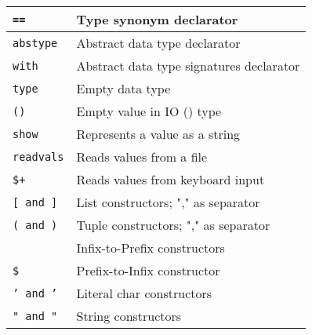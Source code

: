 \documentclass[]{article}
\begin{document}
\begin{minipage}[t][0pt]{\linewidth}
\begin{tabular}{ | l | l | }
	\texttt{==}                     & Type synonym declarator                           \\ \hline
	\texttt{abstype}                & Abstract data type declarator                     \\ \hline
	\texttt{with}                   & Abstract data type signatures declarator          \\ \hline
	\texttt{type}                   & Empty data type                                   \\ \hline
	\texttt{()}                     & Empty value in IO () type                         \\ \hline
	\hline
	\texttt{show}                   & Represents a value as a string                    \\ \hline
	\texttt{readvals}               & Reads values from a file                          \\ \hline
	\texttt{\$+}                    & Reads values from keyboard input                  \\ \hline
	\hline
	\texttt{[ and ]}                & List constructors; "," as separator               \\ \hline
	\texttt{( and )}                & Tuple constructors; "," as separator              \\ 
	                                & Infix-to-Prefix constructors                      \\ \hline
	\texttt{\$}                     & Prefix-to-Infix constructor                       \\ \hline
	\texttt{' and '}                & Literal char constructors                         \\ \hline
	\texttt{" and "}                & String constructors                               \\ \hline
\end{tabular}

\end{minipage}
\end{document}
